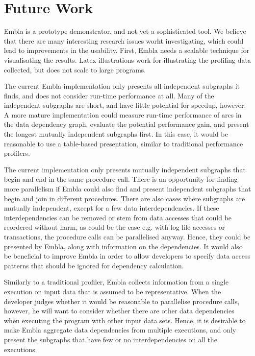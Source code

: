 %

\section{Future Work}

Embla is a prototype demonstrator, and not yet a sophisticated tool.  We
believe that there are many interesting research issues worht
investigating, which could lead to improvements in the usability.  First,
Embla needs a scalable technique for visualisating the results.  Latex
illustrations work for illustrating the profiling data collected, but does
not scale to large programs.  

The current Embla implementation only presents all independent subgraphs it
finds, and does not consider run-time performance at all.  Many of the
independent subgraphs are short, and have little potential for speedup,
however.  A more mature implementation could measure run-time performance
of arcs in the data dependency graph.  evaluate the potential performance
gain, and present the longest mutually independent subgraphs first.  In
this case, it would be reasonable to use a table-based presentation,
similar to traditional performance profilers.

The current implementation only presents mutually independent subgraphs
that begin and end in the same procedure call.  There is an opportunity for
finding more parallelism if Embla could also find and present independent
subgraphs that begin and join in different procedures.  There are also
cases where subgraphs are mutually independent, except for a few data
interdependencies.  If these interdependencies can be removed or stem from
data accesses that could be reordered without harm, as could be the case
e.g. with log file accesses or transactions, the procedure calls can be
parallelised anyway.  Hence, they could be presented by Embla, along with
information on the dependencies.  It would also be beneficial to improve
Embla in order to allow developers to specify data access patterns that
should be ignored for dependency calculation.

Similarly to a traditional profiler, Embla collects information from a
single execution on input data that is assumed to be representative.  When
the developer judges whether it would be reasonable to parallelise
procedure calls, however, he will want to consider whether there are other
data dependencies when executing the program with other input data sets.
Hence, it is desirable to make Embla aggregate data dependencies from
multiple executions, and only present the subgraphs that have few or no
interdependencies on all the executions.
